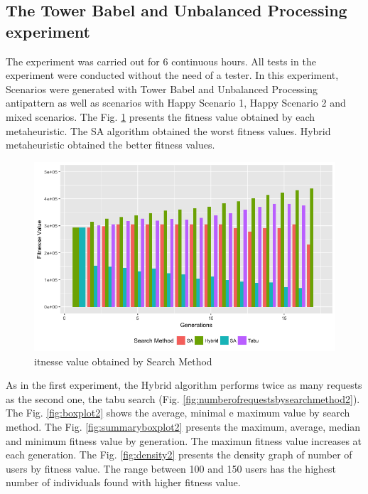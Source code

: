 \documentclass[times]{stvrauth}
\begin{document}
\subsection{The Tower Babel  and Unbalanced Processing experiment}

The experiment was carried out for 6 continuous hours. All tests in the experiment were conducted without the need of a tester. In this experiment, Scenarios were generated with Tower Babel and Unbalanced Processing antipattern as well as scenarios with Happy Scenario 1, Happy Scenario 2 and mixed scenarios. The Fig. \ref{fig:fitnessbygeneration2}  presents the fitness value obtained by each metaheuristic. The SA algorithm obtained the worst fitness values. Hybrid metaheuristic obtained the better fitness values.


\begin{figure}[h]
\centering
\includegraphics[width=.7\textwidth]{./images/experiment2-7.png}
\caption{itnesse value obtained by Search Method}
\label{fig:fitnessbygeneration2}
\end{figure}

As in the first experiment, the Hybrid algorithm performs twice as many requests as the second one, the tabu search (Fig. \ref{fig:numberofrequestsbysearchmethod2}). The Fig. \ref{fig:boxplot2} shows the average, minimal e maximum value by search method. The Fig. \ref{fig:summaryboxplot2} presents the maximum, average, median and minimum fitness value by generation. The maximun fitness value increases at each generation. The Fig. \ref{fig:density2} presents the density graph of number of users by fitness value. The range between 100 and 150 users has the highest number of individuals found with higher fitness value.
\end{document}
